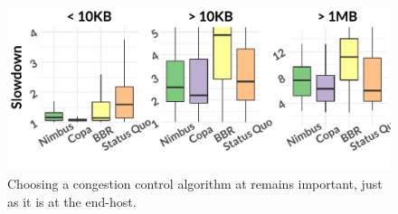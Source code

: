 \begin{figure}
    \centering
\begin{knitrout}
\color{fgcolor}\begin{kframe}


{\ttfamily\noindent\itshape\color{messagecolor}{\#\# Loading required package: sysfonts}}

{\ttfamily\noindent\itshape\color{messagecolor}{\#\# Loading required package: showtextdb}}\end{kframe}
\includegraphics[width=\maxwidth]{figure/eval:cc-1} 

\end{knitrout}
    \caption{Choosing a congestion control algorithm at \name remains important, just as it is at the end-host.}
    \label{fig:eval:cc}
\end{figure}

